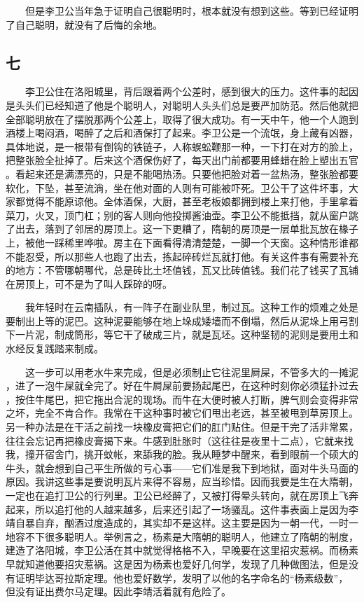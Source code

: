  　　但是李卫公当年急于证明自己很聪明时，根本就没有想到这些。等到已经证明 了自己聪明，就没有了后悔的余地。 
 
 
\subsection{七} 
 
 　　李卫公住在洛阳城里，背后跟着两个公差时，感到很大的压力。这件事的起因 是头头们已经知道了他是个聪明人，对聪明人头头们总是要严加防范。然后他就把 全部聪明放在了摆脱那两个公差上，取得了很大成功。有一天中午，他一个人跑到 酒楼上喝闷酒，喝醉了之后和酒保打了起来。李卫公是一个流氓，身上藏有凶器， 具体地说，是一根带有倒钩的铁链子，人称蜈蚣鞭那一种，一下打在对方的脸上， 把整张脸全扯掉了。后来这个酒保伤好了，每天出门前都要用蜂蜡在脸上塑出五官 。看起来还是满漂亮的，只是不能喝热汤。只要他把脸对着一盆热汤，整张脸都要 软化，下坠，甚至流淌，坐在他对面的人则有可能被吓死。卫公干了这件坏事，大 家都觉得不能原谅他。全体酒保，大厨，甚至老板娘都拥到楼上来打他，手里拿着 菜刀，火叉，顶门杠；别的客人则向他投掷酱油壶。李卫公不能抵挡，就从窗户跳 了出去，落到了邻居的房顶上。这一下更糟了，隋朝的房顶是一层单批瓦放在椽子 上，被他一踩稀里哗啦。房主在下面看得清清楚楚，一脚一个天窗。这种情形谁都 不能忍受，所以那些人也跑了出去，拣起碎砖烂瓦就打他。有关这件事有需要补充 的地方：不管哪朝哪代，总是砖比土坯值钱，瓦又比砖值钱。我们花了钱买了瓦铺 在房顶上，可不是为了叫人踩碎的呀。

 　　我年轻时在云南插队，有一阵子在副业队里，制过瓦。这种工作的烦难之处是 要制出上等的泥巴。这种泥要能够在地上垛成矮墙而不倒塌，然后从泥垛上用弓割 下一片泥，制成筒形，等它干了破成三片，就是瓦坯。这种坚韧的泥则是要用土和 水经反复践踏来制成。

 　　这一步可以用老水牛来完成，但是必须制止它往泥里屙屎，不管多大的一摊泥 ，进了一泡牛屎就全完了。好在牛屙屎前要扬起尾巴，在这种时刻你必须猛扑过去 ，按住牛尾巴，把它拖出合泥的现场。而牛在大便时被人打断，脾气则会变得非常 之坏，完全不肯合作。我常在干这种事时被它们甩出老远，甚至被甩到草房顶上。 另一种办法是在干活之前找一块橡皮膏把它们的肛门贴住。但是干完了活非常累， 往往会忘记再把橡皮膏揭下来。牛感到肚胀时（这往往是夜里十二点），它就来找 我，撞开宿舍门，挑开蚊帐，来舔我的脸。我从睡梦中醒来，看到眼前一个硕大的 牛头，就会想到自己平生所做的亏心事——它们准是我下到地狱，面对牛头马面的 原因。我讲这些事是要说明瓦片来得不容易，应当珍惜。因而我要是生在大隋朝， 一定也在追打卫公的行列里。卫公已经醉了，又被打得晕头转向，就在房顶上飞奔 起来，所以追打他的人越来越多，后来还引起了一场骚乱。这件事表面上是因为李 靖自暴自弃，酗酒过度造成的，其实却不是这样。这主要是因为一朝一代，一时一 地容不下很多聪明人。举例言之，杨素是大隋朝的聪明人，他建立了隋朝的制度， 建造了洛阳城，李卫公活在其中就觉得格格不入，早晚要在这里招灾惹祸。而杨素 早就知道他要招灾惹祸。这是因为杨素也爱好几何学，发现了几种做图法，但是没 有证明毕达哥拉斯定理。他也爱好数学，发明了以他的名字命名的“杨素级数”， 但没有证出费尔马定理。因此李靖活着就有危险了。 

